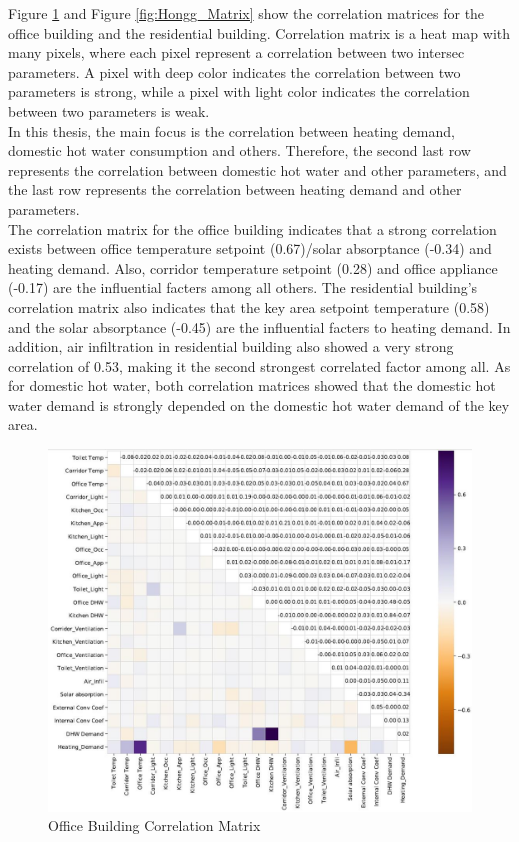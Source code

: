 \documentclass[a4paper, oneside]{discothesis}
\begin{document}
		Figure \ref{fig:Sumatra_Matrix} and Figure \ref{fig:Hongg_Matrix} show the correlation matrices for the office building and the residential building. Correlation matrix is a heat map with many pixels, where each pixel represent a correlation between two intersec parameters. A pixel with deep color indicates the correlation between two parameters is strong, while a pixel with light color indicates the correlation between two parameters is weak.\\
		
		In this thesis, the main focus is the correlation between heating demand, domestic hot water consumption and others. Therefore, the second last row represents the correlation between domestic hot water and other parameters, and the last row represents the correlation between heating demand and other parameters.\\
		
		The correlation matrix for the office building indicates that a strong correlation exists between office temperature setpoint (0.67)/solar absorptance (-0.34) and heating demand. Also, corridor temperature setpoint (0.28) and office appliance (-0.17) are the influential facters among all others. The residential building's correlation matrix also indicates that the key area setpoint temperature (0.58) and the solar absorptance (-0.45) are the influential facters to heating demand. In addition, air infiltration in residential building also showed a very strong correlation of 0.53, making it the second strongest correlated factor among all. As for domestic hot water, both correlation matrices showed that the domestic hot water demand is strongly depended on the domestic hot water demand of the key area.

		
	    \begin{figure}[H]
		\centering
		\includegraphics[scale=0.6]{Sumatra_Matrix.jpg}
		\caption{Office Building Correlation Matrix}
		\label{fig:Sumatra_Matrix}
		\end{figure}
			
\end{document}

